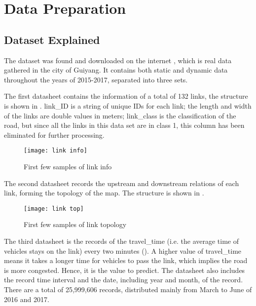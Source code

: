 \chapter{Data Preparation} \label{Chapter:DataPreparation}

\section{Dataset Explained}

The dataset was found and downloaded on the internet \cite{Dataset}, which is real data gathered in the city of Guiyang.
It contains both static and dynamic data throughout the years of 2015-2017, separated into three sets.

The first datasheet contains the information of a total of 132 links, the structure is shown in .
link\_ID is a string of unique IDs for each link; the length and width of the links are double values in meters; 
link\_class is the classification of the road, but since all the links in this data set are in class 1, this column has been eliminated for further processing.

\begin{figure}[!htb]
    \centering
    \texttt{[image: link info]}
    \caption{First few samples of link info}
    \label{Figure:link_info}
\end{figure}

The second datasheet records the upstream and downstream relations of each link, forming the topology of the map. The structure is shown in .

\begin{figure}[!htb]
    \centering
    \texttt{[image: link top]}
    \caption{First few samples of link topology}
    \label{Figure:link_top}
\end{figure}

The third datasheet is the records of the travel\_time (i.e. the average time of vehicles stays on the link) every two minutes (). 
A higher value of travel\_time means it takes a longer time for vehicles to pass the link, which implies the road is more congested. Hence, it is the value to predict. 
The datasheet also includes the record time interval and the date, including year and month, of the record. There are a total of 25,999,606 records, distributed mainly from March to June of 2016 and 2017.


